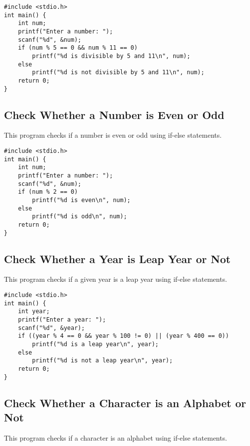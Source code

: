 \documentclass[a4paper,12pt]{article}
\begin{document}
\begin{lstlisting}[caption={Check Whether a Number is Divisible by 5 and 11}]
#include <stdio.h>
int main() {
    int num;
    printf("Enter a number: ");
    scanf("%d", &num);
    if (num % 5 == 0 && num % 11 == 0)
        printf("%d is divisible by 5 and 11\n", num);
    else
        printf("%d is not divisible by 5 and 11\n", num);
    return 0;
}
\end{lstlisting}

\newpage

\subsection{Check Whether a Number is Even or Odd}
This program checks if a number is even or odd using if-else statements.

\begin{lstlisting}[caption={Check Whether a Number is Even or Odd}]
#include <stdio.h>
int main() {
    int num;
    printf("Enter a number: ");
    scanf("%d", &num);
    if (num % 2 == 0)
        printf("%d is even\n", num);
    else
        printf("%d is odd\n", num);
    return 0;
}
\end{lstlisting}

\newpage

\subsection{Check Whether a Year is Leap Year or Not}
This program checks if a given year is a leap year using if-else statements.

\begin{lstlisting}[caption={Check Whether a Year is Leap Year or Not}]
#include <stdio.h>
int main() {
    int year;
    printf("Enter a year: ");
    scanf("%d", &year);
    if ((year % 4 == 0 && year % 100 != 0) || (year % 400 == 0))
        printf("%d is a leap year\n", year);
    else
        printf("%d is not a leap year\n", year);
    return 0;
}
\end{lstlisting}

\newpage

\subsection{Check Whether a Character is an Alphabet or Not}
This program checks if a character is an alphabet using if-else statements.
\end{document}
